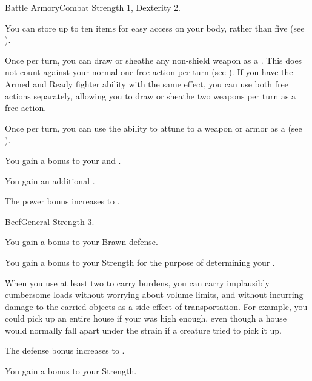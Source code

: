  \begin{feat}{Battle Armory}{Combat}
    \featpre Strength 1, Dexterity 2.

     You can store up to ten items for easy access on your body, rather than five (see ).

     Once per turn, you can draw or sheathe any non-shield weapon as a .
    This does not count against your normal one free action  per turn (see ).
    If you have the Armed and Ready fighter ability with the same effect, you can use both free actions separately, allowing you to draw or sheathe two weapons per turn as a free action.

     Once per turn, you can use the  ability to attune to a weapon or armor as a  (see ).

     You gain a  bonus to your  and .

     You gain an additional .

     The power bonus increases to .
  \end{feat}

  \begin{feat}{Beef}{General}
    \featpre Strength 3.

     You gain a  bonus to your Brawn defense.

     You gain a  bonus to your Strength for the purpose of determining your .

     When you use at least two  to carry burdens, you can carry implausibly cumbersome loads without worrying about volume limits, and without incurring damage to the carried objects as a side effect of transportation.
    For example, you could pick up an entire house if your  was high enough, even though a house would normally fall apart under the strain if a creature tried to pick it up.

     The defense bonus increases to .

     You gain a  bonus to your Strength.
  \end{feat}

